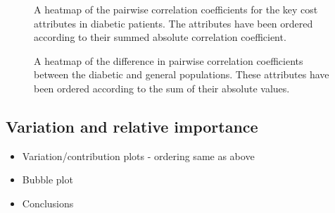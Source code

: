 \begin{figure}[htbp]
    \caption{A heatmap of the pairwise correlation coefficients for the key cost
        attributes in diabetic patients. The attributes have been ordered
        according to their summed absolute correlation coefficient.}%
    \label{fig:diabetes_corr_heatmap}
\end{figure}

\begin{figure}[htbp]
    \caption{A heatmap of the difference in pairwise correlation coefficients
        between the diabetic and general populations. These attributes have been
        ordered according to the sum of their absolute values.}%
    \label{fig:diabetes_corr_difference}
\end{figure}


\subsection{Variation and relative importance}\label{subsec:diabetes_variation}

\begin{itemize}
    \item Variation/contribution plots \-- ordering same as above
    \item Bubble plot
    \item Conclusions
\end{itemize}
